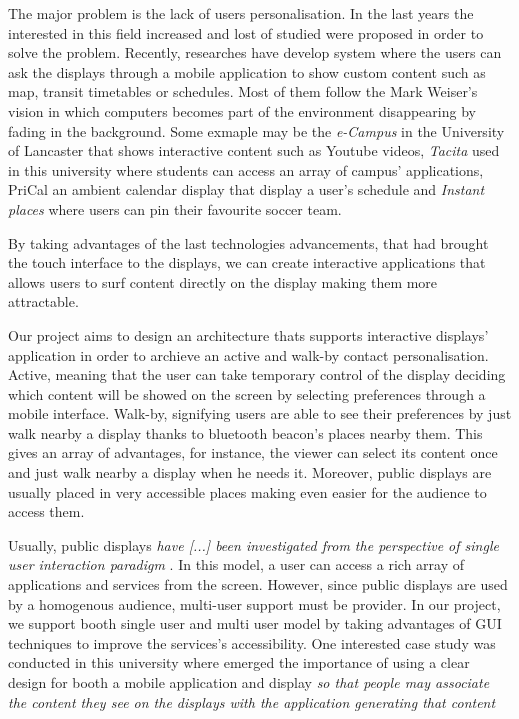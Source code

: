 \documentclass[]{usiinfbachelorproject}
\begin{document}
The major problem is the lack of users personalisation. In the last years the interested in this field increased and lost of studied were proposed in order to solve the problem. Recently, researches have develop system where the users can ask the displays through a mobile application to show custom content such as map, transit timetables or schedules. Most of them follow the Mark Weiser's \cite{the_computer_for} vision in which computers becomes part of the environment disappearing by fading in the background.
Some exmaple may be the \emph{e-Campus} \cite{e_campus} in the University of Lancaster that shows interactive content such as Youtube videos, \emph{Tacita} used in this university where students can access an array of campus' applications, PriCal\cite{pri_cal} an ambient calendar display that display a user's schedule and \emph{Instant places} \cite{pins_and_posters} where users can pin their favourite soccer team.

By taking advantages of the last technologies advancements, that had brought the touch interface to the displays, we can create interactive applications that allows users to surf content directly on the display making them more attractable.

Our project aims to design an architecture thats supports interactive displays' application in order to archieve an active and walk-by contact personalisation. Active, meaning that the user can take temporary control of the display deciding which content will be showed on the screen by selecting preferences through a mobile interface. 
Walk-by, signifying users are able to see their preferences by just walk nearby a display thanks to bluetooth beacon's places nearby them. This gives an array of advantages, for instance, the viewer can select its content once and just walk nearby a display when he needs it. Moreover, public displays are usually placed in very accessible places making even easier for the audience to access them. 

Usually, public displays  \emph {have [...] been investigated from the perspective of single user
interaction paradigm} \cite{personalisation_and_privacy}. In this model, a user can access a rich array of applications and services from the screen. However, since public displays are used by a homogenous audience, multi-user support must be provider. In our project, we support booth single user and multi user model by taking advantages of GUI techniques to improve the services's accessibility. One interested case study was conducted in this university \cite{design_considerations} where emerged the importance of using a clear design for booth a mobile application and display  \emph{so that people may associate the content they see on the displays with the application generating that content} \cite{design_considerations}
\end{document}
